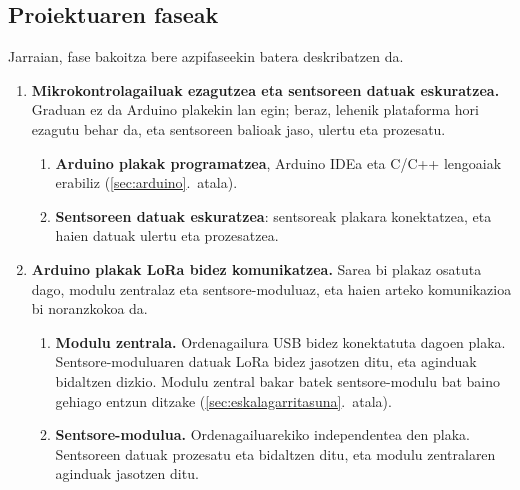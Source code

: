 \documentclass[10pt]{article}
\begin{document}
\subsection{Proiektuaren faseak}
\label{sec:faseak}

Jarraian, fase bakoitza bere azpifaseekin batera deskribatzen da.

\begin{enumerate}
\item \textbf{Mikrokontrolagailuak ezagutzea eta sentsoreen datuak eskuratzea.} Graduan ez da Arduino plakekin lan egin; beraz, lehenik plataforma hori ezagutu behar da, eta sentsoreen balioak jaso, ulertu eta prozesatu.
  \begin{enumerate}
    \item \textbf{Arduino plakak programatzea}, Arduino \ac{IDE}a eta C/C++ lengoaiak erabiliz (\ref{sec:arduino}.~atala).
    \item \textbf{Sentsoreen datuak eskuratzea}: sentsoreak plakara konektatzea, eta haien datuak ulertu eta prozesatzea.
  \end{enumerate}

\item \textbf{Arduino plakak \ac{LoRa} bidez komunikatzea.} Sarea bi plakaz osatuta dago, modulu zentralaz eta sentsore-moduluaz, eta haien arteko komunikazioa bi noranzkokoa da.
  \begin{enumerate}
    \item \textbf{Modulu zentrala.} Ordenagailura \ac{USB} bidez konektatuta dagoen plaka. Sentsore-moduluaren datuak \ac{LoRa} bidez jasotzen ditu, eta aginduak bidaltzen dizkio. Modulu zentral bakar batek sentsore-modulu bat baino gehiago entzun ditzake (\ref{sec:eskalagarritasuna}.~atala).
    \item \textbf{Sentsore-modulua.} Ordenagailuarekiko independentea den plaka. Sentsoreen datuak prozesatu eta bidaltzen ditu, eta modulu zentralaren aginduak jasotzen ditu.
  \end{enumerate}


\end{enumerate}
\end{document}
